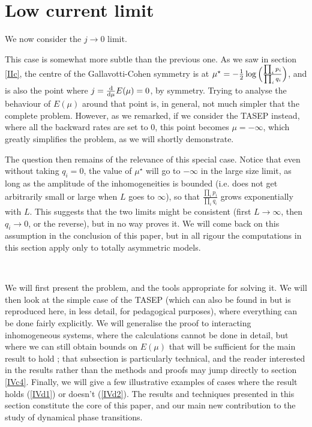 \documentclass[aps,pre,onecolumn,showpacs,showkeys,a4paper]{revtex4-1}
\begin{document}
\newpage

\section{Low current limit}
\label{IV}

We now consider the $j\rightarrow0$ limit.

This case is somewhat more subtle than the previous one. As we saw in section \ref{IIc}, the centre of the Gallavotti-Cohen symmetry is at $\mu^\star=-\frac{1}{2}\log{\Bigl(\frac{\prod_i p_i}{\prod_i q_i}\Bigr)}$, and is also the point where $j=\frac{{\rm d}}{{\rm d}\mu} E(\mu)=0$, by symmetry. Trying to analyse the behaviour of $E(\mu)$ around that point is, in general, not much simpler that the complete problem. However, as we remarked, if we consider the TASEP instead, where all the backward rates are set to $0$, this point becomes $\mu=-\infty$, which greatly simplifies the problem, as we will shortly demonstrate.

The question then remains of the relevance of this special case. Notice that even without taking $q_i=0$, the value of $\mu^\star$ will go to $-\infty$ in the large size limit, as long as the amplitude of the inhomogeneities is bounded (i.e. does not get arbitrarily small or large when $L$ goes to $\infty$), so that $\frac{\prod_i p_i}{\prod_i q_i}$ grows exponentially with $L$. This suggests that the two limits might be consistent (first $L\rightarrow\infty$, then $q_i\rightarrow 0$, or the reverse), but in no way proves it. We will come back on this assumption in the conclusion of this paper, but in all rigour the computations in this section apply only to totally asymmetric models.

~

We will first present the problem, and the tools appropriate for solving it. We will then look at the simple case of the TASEP (which can also be found in \cite{Lazarescu2015} but is reproduced here, in less detail, for pedagogical purposes), where everything can be done fairly explicitly. We will generalise the proof to interacting inhomogeneous systems, where the calculations cannot be done in detail, but where we can still obtain bounds on $E(\mu)$ that will be sufficient for the main result to hold ; that subsection is particularly technical, and the reader interested in the results rather than the methods and proofs may jump directly to section \ref{IVc4}. Finally, we will give a few illustrative examples of cases where the result holds (\ref{IVd1}) or doesn't (\ref{IVd2}). The results and techniques presented in this section constitute the core of this paper, and our main new contribution to the study of dynamical phase transitions.
\end{document}
